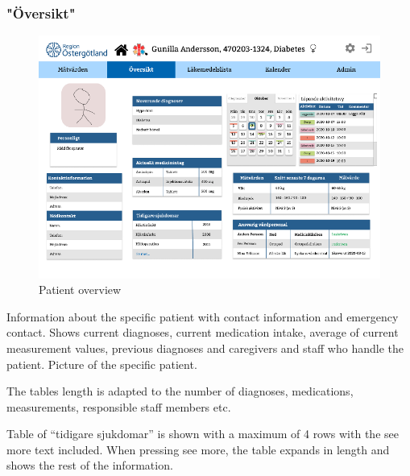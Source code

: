 \documentclass{scrreprt}
\begin{document}
\subsubsection{"Översikt"}
\begin{figure}[h!]
    \centering
    \includegraphics[width=15cm]{patoverview.png}
    \caption{Patient overview}
    \label{fig: patoverview}
\end{figure}
Information about the specific patient with contact information and emergency contact. Shows current diagnoses, current medication intake, average of current measurement values, previous diagnoses and caregivers and staff who handle the patient. Picture of the specific patient.

The tables length is adapted to the number of diagnoses, medications, measurements, responsible staff members etc. 

Table of “tidigare sjukdomar” is shown with a maximum of 4 rows with the see more text included. When pressing see more, the table expands in length and shows the rest of the information.


\clearpage
\end{document}
